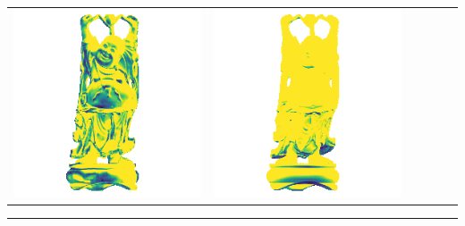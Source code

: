 \begin{tabularx}{\linewidth}{@{}Y@{}Y@{}Y@{}Y@{}Y@{}Y@{}}
\includegraphics[width=\linewidth]{semisynthetic/20150514_20_marrnet_err.png} &
\includegraphics[width=\linewidth]{semisynthetic/20150514_20_ef_err.png} \\
\end{tabularx}
\begin{center}\rule{0.5\linewidth}{\linethickness}\end{center}

